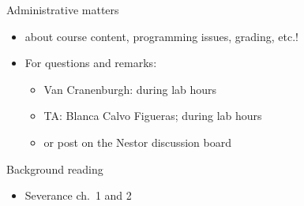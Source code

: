 \documentclass[aspectratio=169,usenames,dvipsnames]{beamer}
\begin{document}
\begin{frame}{Administrative matters}
    \begin{itemize}
        \item {} about course content,
            programming issues, grading, etc.!
        \item For questions and remarks:
            \begin{itemize}
                \item Van Cranenburgh: during lab hours
                \item TA: Blanca Calvo Figueras; during lab hours
                \item or post on the Nestor discussion board
            \end{itemize}
    \end{itemize}
\end{frame}


\begin{frame}{Background reading}
    \begin{itemize}
        \item Severance ch.\ 1 and 2
    \end{itemize}
\end{frame}
\end{document}

